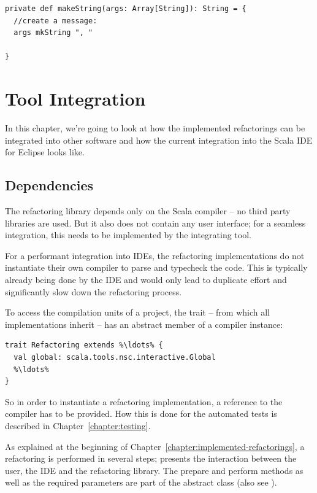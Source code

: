 \documentclass[10pt,a4paper,oneside]{scrreprt}
\begin{document}
\begin{lstlisting}
private def makeString(args: Array[String]): String = {
  //create a message:
  args mkString ", "

}
\end{lstlisting}

\chapter{Tool Integration} \label{chapter:tool-integration}

In this chapter, we're going to look at how the implemented refactorings can be integrated into other software and how the current integration into the Scala IDE for Eclipse looks like.

\section{Dependencies}

The refactoring library depends only on the Scala compiler -- no third party libraries are used. But it also does not contain any user interface; for a seamless integration, this needs to be implemented by the integrating tool.

For a performant integration into IDEs, the refactoring implementations do not instantiate their own compiler to parse and typecheck the code. This is typically already being done by the IDE and would only lead to duplicate effort and significantly slow down the refactoring process.

To access the compilation units of a project, the  trait -- from which all implementations inherit -- has an abstract member of a compiler instance:

\begin{lstlisting}
trait Refactoring extends %\ldots% {
  val global: scala.tools.nsc.interactive.Global
  %\ldots% 
}
\end{lstlisting}

So in order to instantiate a refactoring implementation, a reference to the compiler has to be provided. How this is done for the automated tests is described in Chapter~\vref{chapter:testing}.

As explained at the beginning of Chapter~\vref{chapter:implemented-refactorings}, a refactoring is performed in several steps;  presents the interaction between the user, the IDE and the refactoring library. The prepare and perform methods as well as the required parameters are part of the  abstract class (also see ).
\end{document}
